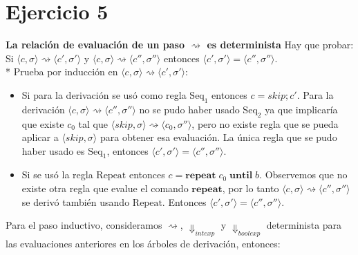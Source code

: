 \documentclass[12pt,a4paper]{article}
\begin{document}
\section*{Ejercicio 5}
\textbf{La relaci\'on de evaluaci\'on de un paso
$\rightsquigarrow$ es determinista}
Hay que probar: Si $\langle c, \sigma \rangle \rightsquigarrow
\langle c', \sigma' \rangle$ y $\langle c, \sigma \rangle \rightsquigarrow
\langle c'', \sigma'' \rangle$ entonces
$\langle c', \sigma' \rangle = \langle c'', \sigma'' \rangle$. \\*
Prueba por inducci\'on en $\langle c, \sigma \rangle \rightsquigarrow
\langle c', \sigma' \rangle$:
\begin{itemize}
\item Si para la derivaci\'on se us\'o como regla $\mathrm{Seq_{1}}$
    entonces $c = skip; c'$. Para la derivaci\'on $\langle c,\sigma
    \rangle \rightsquigarrow \langle c'',\sigma'' \rangle$ no se
    pudo haber usado $\mathrm{Seq_{2}}$ ya que implicar\'ia que
    existe $c_{0}$ tal que $\langle skip,\sigma \rangle \rightsquigarrow
    \langle c_{0},\sigma'' \rangle$, pero no existe regla que se pueda
    aplicar a $\langle skip, \sigma \rangle$ para obtener esa evaluaci\'on. 
    La \'unica regla que se pudo haber usado es $\mathrm{Seq_{1}}$,
    entonces $\langle c',\sigma' \rangle = \langle c'',\sigma'' \rangle$.
\item Si se us\'o la regla $\mathrm{Repeat}$ entonces $c = \textbf{repeat}
    \;c_{0}\;\textbf{until}\;b$. Observemos que no existe otra regla que evalue
    el comando $\textbf{repeat}$, por lo tanto $\langle c,\sigma \rangle
    \rightsquigarrow \langle c'',\sigma'' \rangle$ se deriv\'o tambi\'en
    usando $\mathrm{Repeat}$. Entonces $\langle c',\sigma' \rangle =
    \langle c'',\sigma'' \rangle$.
\end{itemize}
Para el paso inductivo, consideramos $\rightsquigarrow$, $\Downarrow_{intexp}$
y $\Downarrow_{boolexp}$ determinista para las evaluaciones anteriores en los
\'arboles de derivaci\'on, entonces:
\end{document}
